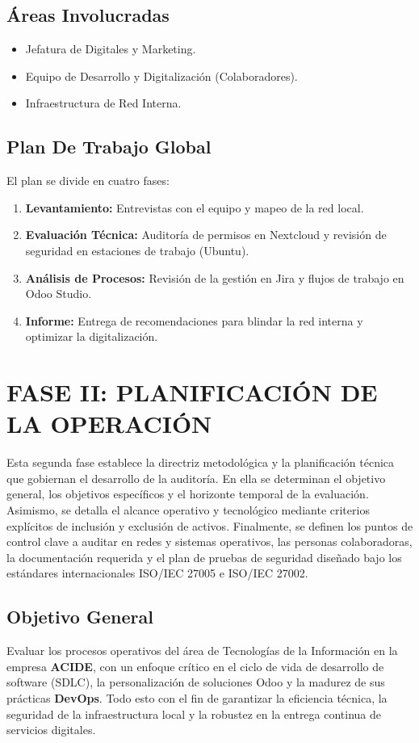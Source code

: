 \documentclass[12pt]{article}
\begin{document}
\subsection{Áreas Involucradas}
\begin{itemize}
    \item Jefatura de Digitales y Marketing.
    \item Equipo de Desarrollo y Digitalización (Colaboradores).
    \item Infraestructura de Red Interna.
\end{itemize}

\subsection{Plan De Trabajo Global}
El plan se divide en cuatro fases:
\begin{enumerate}
    \item \textbf{Levantamiento:} Entrevistas con el equipo y mapeo de la red local.
    \item \textbf{Evaluación Técnica:} Auditoría de permisos en Nextcloud y revisión de seguridad en estaciones de trabajo (Ubuntu).
    \item \textbf{Análisis de Procesos:} Revisión de la gestión en Jira y flujos de trabajo en Odoo Studio.
    \item \textbf{Informe:} Entrega de recomendaciones para blindar la red interna y optimizar la digitalización.
\end{enumerate}

\clearpage
\section{FASE II: PLANIFICACIÓN DE LA OPERACIÓN}

Esta segunda fase establece la directriz metodológica y la planificación técnica que gobiernan el desarrollo de la auditoría. En ella se determinan el objetivo general, los objetivos específicos y el horizonte temporal de la evaluación. Asimismo, se detalla el alcance operativo y tecnológico mediante criterios explícitos de inclusión y exclusión de activos. Finalmente, se definen los puntos de control clave a auditar en redes y sistemas operativos, las personas colaboradoras, la documentación requerida y el plan de pruebas de seguridad diseñado bajo los estándares internacionales ISO/IEC 27005 e ISO/IEC 27002.

\subsection{Objetivo General}
Evaluar los procesos operativos del área de Tecnologías de la Información en la empresa \textbf{ACIDE}, con un enfoque crítico en el ciclo de vida de desarrollo de software (SDLC), la personalización de soluciones Odoo y la madurez de sus prácticas \textbf{DevOps}. Todo esto con el fin de garantizar la eficiencia técnica, la seguridad de la infraestructura local y la robustez en la entrega continua de servicios digitales.
\end{document}
